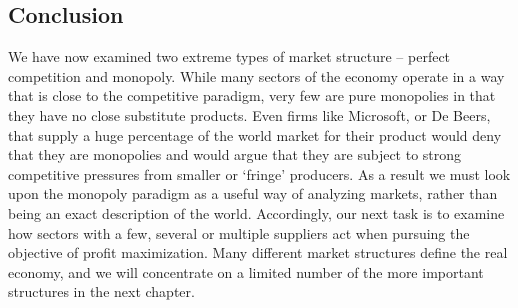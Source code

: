 \subsection*{Conclusion}

We have now examined two extreme types of market structure -- perfect competition and monopoly.  While many sectors of the economy operate in a way that is close to the competitive paradigm, very few are pure monopolies in that they have no close substitute products.  Even firms like Microsoft, or De Beers, that supply a huge percentage of the world market for their product would deny that they are monopolies and would argue that they are subject to strong competitive pressures from smaller or `fringe' producers. As a result we must look upon the monopoly paradigm as a useful way of analyzing markets, rather than being an exact description of the world. Accordingly, our next task is to examine how sectors with a few, several or multiple suppliers act when pursuing the objective of profit maximization. Many different market structures define the real economy, and we will concentrate on a limited number of the more important structures in the next chapter.